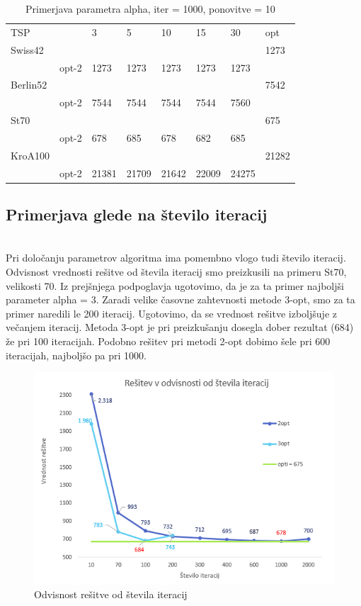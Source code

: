\documentclass[12pt,a4paper]{amsart}
\theoremstyle{definition} %
\theoremstyle{plain} %
\begin{document}
\begin{table}[H]
\caption{Primerjava parametra alpha, iter = 1000, ponovitve = 10}
\begin{tabular}{llllllll}
\rowcolor[HTML]{FFCCC9} 
TSP      &       & 3     & 5     & 10    & 15   & 30   & opt   \\
Swiss42 &       &       &       &       &      &      & 1273  \\
         & opt-2 & 1273  & 1273  & 1273  & 1273 & 1273 &       \\
Berlin52  &       &       &       &       &      &      & 7542  \\
         & opt-2 & 7544  & 7544  & 7544  & 7544 & 7560 &       \\
St70     &       &       &       &       &      &      & 675   \\
         & opt-2 & 678   & 685   & 678   & 682  & 685  &       \\
KroA100  &       &       &       &       &      &      & 21282 \\
         & opt-2 & 21381 & 21709 & 21642 &  22009    &  24275    &      
\end{tabular}
\end{table}

\subsection{Primerjava glede na število iteracij} ~\\

Pri določanju parametrov algoritma ima pomembno vlogo tudi število iteracij. Odvisnost vrednosti rešitve od števila iteracij smo preizkusili na primeru St70, velikosti 70. Iz prejšnjega podpoglavja ugotovimo, da je za ta primer najboljši parameter alpha = 3. Zaradi velike časovne zahtevnosti metode 3-opt, smo za ta primer naredili le 200 iteracij. Ugotovimo, da se vrednost rešitve izboljšuje z večanjem iteracij. Metoda 3-opt je pri preizkušanju dosegla dober rezultat (684) že pri 100 iteracijah. Podobno rešitev pri metodi 2-opt dobimo šele pri 600 iteracijah, najboljšo pa pri 1000.

\begin{figure}[H]
\caption{Odvisnost rešitve od števila iteracij}
\centering
\includegraphics[scale =0.8]{resitev_iteracije1}
\end{figure}
\end{document}
